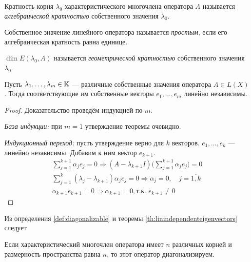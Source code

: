 \begin{definition}
    Кратность корня $\lambda_0$ характеристического многочлена оператора $A$
    называется \emph{алгебраической кратностью} собственного значения
    $\lambda_0$.
\end{definition}

\begin{definition}
    Собственное значение линейного оператора называется \emph{простым}, если его
    алгебраическая кратность равна единице.
\end{definition}

\begin{definition}
    $\dim E(\lambda_0, A)$ называется \emph{геометрической кратностью} собственного
    значения $\lambda_0$.
\end{definition}

\begin{theorem} \label{th:linindependenteigenvectors}
    Пусть $\lambda_1, \dotsc, \lambda_m \in \mathbb{K}$ — различные собственные
    значения оператора $A\in L(X)$. Тогда соответствующие им собственные векторы
    $e_1, \dotsc, e_m$ линейно независимы.
\end{theorem}
\begin{proof}
    Доказательство проведём индукцией по $m$.
    
    \emph{База индукции:} при $ m=1$ утверждение теоремы очевидно.

    \emph{Индукционный переход:} пусть утверждение верно для $k$ векторов.
    $e_1, \dotsc, e_k$ — линейно независимы. Добавим к ним вектор $e_{k+1}$.
    \begin{gather*}
        \sum_{j=1}^{k+1} \alpha_j e_j = 0 \Rightarrow
        (A - \lambda_{k+1} I)\bigg( \sum_{j=1}^{k+1} \alpha_j e_j \bigg) = 0 \\
        \sum_{j=1}^{k} (\lambda_j - \lambda_{k+1}) \alpha_j e_j = 0 \Rightarrow
        \alpha_j = 0, \quad j = \overline{1,k}  \\
        \alpha_{k+1} e_{k+1} = 0 \Rightarrow \alpha_{k+1} = 0, \text{т.к. }
            e_{k+1} \neq 0 
    \end{gather*}
\end{proof}

Из определения \ref{def:diagonalizable} и теоремы \ref{th:linindependenteigenvectors} следует

\begin{theorem} \label{th:simpledifferenteigenvalues}
    Если характеристический многочлен оператора имеет $n$ различных корней и
    размерность пространства равна $n$, то этот оператор диагонализируем.
\end{theorem}
